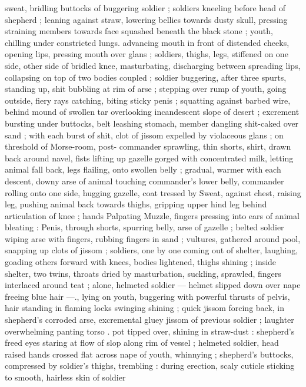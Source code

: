 sweat, bridling buttocks of buggering soldier ; soldiers kneeling 
before head of shepherd ; leaning against straw, lowering bellies 
towards dusty skull, pressing straining members towards face 
squashed beneath the black stone ; youth, chilling under constricted 
lungs. advancing mouth in front of distended cheeks, opening lips, 
pressing mouth over glans ; soldiers, thighs, legs, stiffened on one 
side, other side of bridled knee, masturbating, discharging between 
spreading lips, collapsing on top of two bodies coupled ; soldier 
buggering, after three spurts, standing up, shit bubbling at rim of 
arse ; stepping over rump of youth, going outside, fiery rays 
catching, biting sticky penis ; squatting against barbed wire, behind 
mound of swollen tar overlooking incandescent slope of desert ; 
excrement bursting under buttocks, belt leashing stomach, member 
dangling shit-caked over sand ; with each burst of shit, clot of jissom 
expelled by violaceous glans ; on threshold of Morse-room, post- 
commander sprawling, thin shorts, shirt, drawn back around navel, 
fists lifting up gazelle gorged with concentrated milk, letting animal 
fall back, legs flailing, onto swollen belly ; gradual, warmer with each 
descent, downy arse of animal touching commander's lower belly, 
commander rolling onto one side, hugging gazelle, coat tressed by 
Sweat, against chest, raising leg, pushing animal back towards 
thighs, gripping upper hind leg behind articulation of knee ; hands 
Palpating Muzzle, fingers pressing into ears of animal bleating : 
Penis, through shorts, spurring belly, arse of gazelle ; belted soldier 
wiping arse with fingers, rubbing fingers in sand ; vultures, gathered 
around pool, snapping up clots of jissom ; soldiers, one by one 
coming out of shelter, laughing, goading others forward with knees, 
bodies lightened, thighs shining ; inside shelter, two twins, throats 
dried by masturbation, suckling, sprawled, fingers interlaced around 
teat ; alone, helmeted soldier --- helmet slipped down over nape 
freeing blue hair ---., lying on youth, buggering with powerful thrusts 
of pelvis, hair standing in flaming locks swinging shining ; quick 
jissom forcing back, in shepherd's corroded arse, excremental gluey 
jissom of previous soldier ; laughter overwhelming panting torso . 
pot tipped over, shining in straw-dust : shepherd's freed eyes staring 
at flow of slop along rim of vessel ; helmeted soldier, head raised 
hands crossed flat across nape of youth, whinnying ; shepherd's 
buttocks, compressed by soldier's thighs, trembling : during 
erection, scaly cuticle sticking to smooth, hairless skin of soldier 
